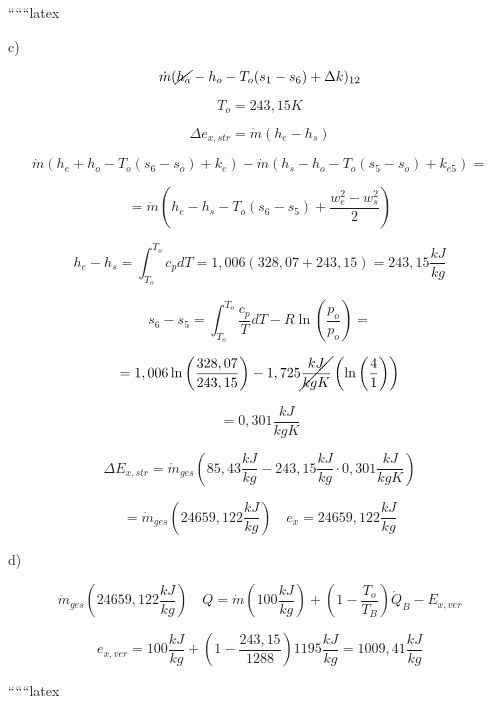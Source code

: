 ``````latex

c)

\[
\dot{m} (\cancel{h_a} - h_o - T_o (s_{1} - s_{6}) + \Delta k)_{12}
\]

\[
T_o = 243,15 K
\]

\[
\Delta e_{x,str} = \dot{m} (h_e - h_s)
\]

\[
\dot{m} \left( h_e + h_o - T_o (s_6 - s_o) + k_e \right) - \dot{m} \left( h_s - h_o - T_o (s_5 - s_o) + k_{e5} \right) =
\]

\[
= \dot{m} \left( h_e - h_s - T_o (s_6 - s_5) + \frac{w_{e}^{2} - w_{s}^{2}}{2} \right)
\]

\[
h_e - h_s = \int_{T_o}^{T_o} c_p dT = 1,006 \left( 328,07 + 243,15 \right) = 243,15 \frac{kJ}{kg}
\]

\[
s_6 - s_5 = \int_{T_o}^{T_o} \frac{c_p}{T} dT - R \ln \left( \frac{p_o}{p_o} \right) =
\]

\[
= 1,006 \ln \left( \frac{328,07}{243,15} \right) - 1,725 \cancel{\frac{kJ}{kgK}} \left( \ln \left( \frac{4}{1} \right) \right)
\]

\[
= 0,301 \frac{kJ}{kgK}
\]

\[
\Delta E_{x,str} = \dot{m}_{ges} \left( 85,43 \frac{kJ}{kg} - 243,15 \frac{kJ}{kg} \cdot 0,301 \frac{kJ}{kgK} \right)
\]

\[
= \dot{m}_{ges} \left( 24659,122 \frac{kJ}{kg} \right) \quad e_x = 24659,122 \frac{kJ}{kg}
\]

d)

\[
\dot{m}_{ges} \left( 24659,122 \frac{kJ}{kg} \right) \quad Q = \dot{m} \left( 100 \frac{kJ}{kg} \right) + \left( 1 - \frac{T_o}{T_B} \right) \dot{Q}_B - E_{x,ver}
\]

\[
e_{x,ver} = 100 \frac{kJ}{kg} + \left( 1 - \frac{243,15}{1288} \right) 1195 \frac{kJ}{kg} = 1009,41 \frac{kJ}{kg}
\]

``````latex


